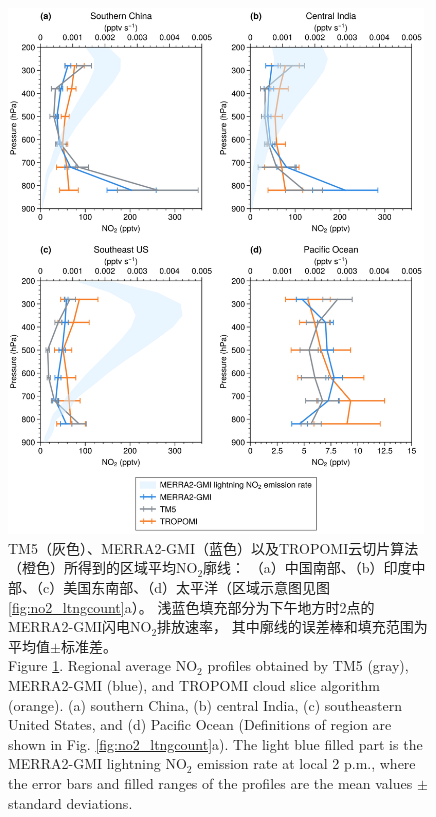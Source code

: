 \begin{figure}[!htbp]
    \centering
    \includegraphics[width=11cm]{./figures/utno2_profile.png}
    \caption{
    TM5（灰色）、MERRA2-GMI（蓝色）以及TROPOMI云切片算法（橙色）所得到的区域平均NO$_2$廓线：
    （a）中国南部、（b）印度中部、（c）美国东南部、（d）太平洋（区域示意图见图\ref{fig:no2_ltngcount}a）。
    浅蓝色填充部分为下午地方时2点的MERRA2-GMI闪电NO$_2$排放速率，
    其中廓线的误差棒和填充范围为平均值$\pm$标准差。\\
    Figure \ref{fig:utno2_profile}. Regional average NO$_2$ profiles obtained by TM5 (gray), MERRA2-GMI (blue), and TROPOMI cloud slice algorithm (orange).
    (a) southern China, (b) central India, (c) southeastern United States, and (d) Pacific Ocean
    (Definitions of region are shown in Fig. \ref{fig:no2_ltngcount}a).
    The light blue filled part is the MERRA2-GMI lightning NO$_2$ emission rate at local 2 p.m.,
    where the error bars and filled ranges of the profiles are the mean values $\pm$ standard deviations.
    }
    \label{fig:utno2_profile}
\end{figure}
\FloatBarrier


